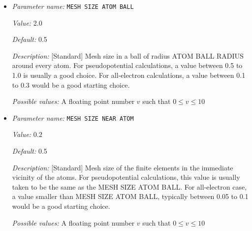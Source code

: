 \begin{itemize}
{\it Value:} 10


{\it Default:} 10


{\it Description:} [Developer] Maximum number of refinement steps to be used. The default value is good enough in most cases.


{\it Possible values:} An integer $n$ such that $1\leq n \leq 10$
\item {\it Parameter name:} {\tt MESH SIZE ATOM BALL}
\label{parameters:Finite element mesh parameters/Auto mesh generation parameters/MESH SIZE ATOM BALL}
\label{parameters:Finite_20element_20mesh_20parameters/Auto_20mesh_20generation_20parameters/MESH_20SIZE_20ATOM_20BALL}


{\it Value:} 2.0


{\it Default:} 0.5


{\it Description:} [Standard] Mesh size in a ball of radius ATOM BALL RADIUS around every atom. For pseudopotential calculations, a value between 0.5 to 1.0 is usually a good choice. For all-electron calculations, a value between 0.1 to 0.3 would be a good starting choice.


{\it Possible values:} A floating point number $v$ such that $0 \leq v \leq 10$
\item {\it Parameter name:} {\tt MESH SIZE NEAR ATOM}
\label{parameters:Finite element mesh parameters/Auto mesh generation parameters/MESH SIZE NEAR ATOM}
\label{parameters:Finite_20element_20mesh_20parameters/Auto_20mesh_20generation_20parameters/MESH_20SIZE_20NEAR_20ATOM}


{\it Value:} 0.2


{\it Default:} 0.5


{\it Description:} [Standard] Mesh size of the finite elements in the immediate vicinity of the atoms. For pseudopotential calculations, this value is usually taken to be the same as the MESH SIZE ATOM BALL. For all-electron case, a value smaller than MESH SIZE ATOM BALL, typically between 0.05 to 0.1 would be a good starting choice.


{\it Possible values:} A floating point number $v$ such that $0 \leq v \leq 10$
\end{itemize}

